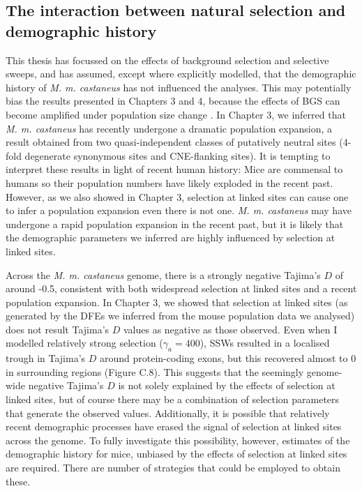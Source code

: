 \subsection{The interaction between natural selection and demographic history}

	This thesis has focussed on the effects of background selection and selective sweeps, and has assumed, except where explicitly modelled, that the demographic history of \textit{M. m. castaneus} has not influenced the analyses. This may potentially bias the results presented in Chapters 3 and 4, because the effects of BGS can become amplified under population size change \citep{RN397}. In Chapter 3, we inferred that \textit{M. m. castaneus} has recently undergone a dramatic population expansion, a result obtained from two quasi-independent classes of putatively neutral sites (4-fold degenerate synonymous sites and CNE-flanking sites). It is tempting to interpret these results in light of recent human history: Mice are commensal to humans so their population numbers have likely exploded in the recent past. However, as we also showed in Chapter 3, selection at linked sites can cause one to infer a population expansion even there is not one. \textit{M. m. castaneus} may have undergone a rapid population expansion in the recent past, but it is likely that the demographic parameters we inferred are highly influenced by selection at linked sites.
	
	Across the \textit{M. m. castaneus} genome, there is a strongly negative Tajima's $D$ of around -0.5, consistent with both widespread selection at linked sites and a recent population expansion. In Chapter 3, we showed that selection at linked sites (as generated by the DFEs we inferred from the mouse population data we analysed) does not result Tajima's $D$ values as negative as those observed. Even when I modelled relatively strong selection ($\gamma_a = 400$), SSWs resulted in a localised trough in Tajima's $D$ around protein-coding exons, but this recovered almost to 0 in surrounding regions (Figure C.8). This suggests that the seemingly genome-wide negative Tajima's $D$ is not solely explained by the effects of selection at linked sites, but of course there may be a combination of selection parameters that generate the observed values. Additionally, it is possible that relatively recent demographic processes have erased the signal of selection at linked sites across the genome. To fully investigate this possibility, however, estimates of the demographic history for mice, unbiased by the effects of selection at linked sites are required. There are number of strategies that could be employed to obtain these.

